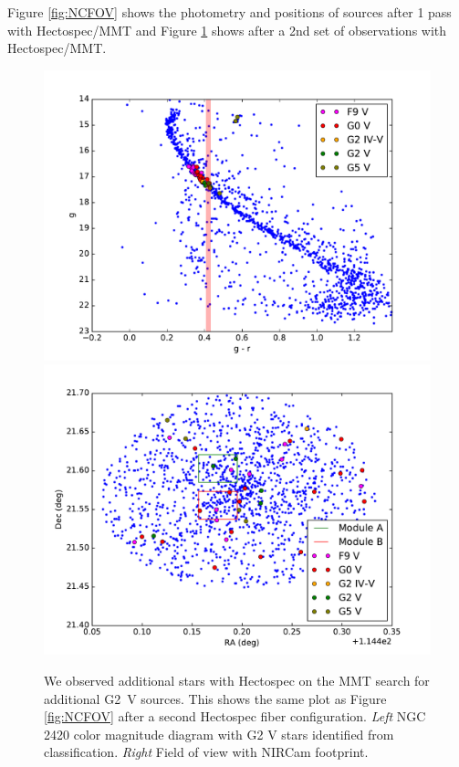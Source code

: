 \documentclass{aastex6}
\begin{document}
Figure \ref{fig:NCFOV} shows the photometry and positions of sources after 1 pass with Hectospec/MMT and Figure \ref{fig:NCFOV2ndrun} shows after a 2nd set of observations with Hectospec/MMT.

\begin{figure}[!hbtp]
\centering
\includegraphics[width=.49\columnwidth]{colormag_two_runs.pdf}
\includegraphics[width=.49\columnwidth]{fov_ngc2420_two_runs.pdf}
\caption{We observed additional stars with Hectospec on the MMT search for additional G2~V sources. This shows the same plot as Figure \ref{fig:NCFOV} after a second Hectospec fiber configuration.
{\it Left} NGC 2420 color magnitude diagram with G2 V stars identified from classification. {\it Right} Field of view with NIRCam footprint.}\label{fig:NCFOV2ndrun}
\end{figure}
\end{document}
